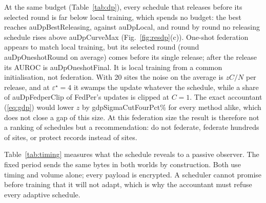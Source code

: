 \begin{table}[t]
\caption{Timing side channel (5 seeds per world): observer AUC (\ref{eq:auc}) for each observable of Section~\ref{sec:setup}; 0.5 is chance}
\label{tab:timing}
\centering\footnotesize
{}
\end{table}
At the same budget (Table~\ref{tab:dp}), every schedule that releases before its selected round is far below local training, which spends no budget: the best reaches \num{auDpBestReleasing}, against \num{auDpLocal}, and round by round no releasing schedule rises above \num{auDpCurveMax} (Fig.~\ref{fig:resdp}(c)). One-shot federation appears to match local training, but  its selected round (round \num{auDpOneshotRound} on average) comes before its single release; after the release its AUROC is \num{auDpOneshotFinal}. It is local training from a common initialisation, not federation. With 20 sites the noise on the average is $zC/N$ per release, and at $\varepsilon^\star=4$ it swamps the update whatever the schedule, while a share of \num{auDpFedperClip} of FedPer's updates is clipped at $C=1$. The exact accountant (\ref{eq:gdp}) would lower $z$ by \num{gdpSigmaCutFourPct}\% for every method alike, which does not close a gap of this size. At this federation size the result is therefore not a ranking of schedules but a recommendation: do not federate, federate hundreds of sites, or protect records instead of sites.

Table~\ref{tab:timing} measures what the schedule reveals to a passive observer. The fixed period sends the same bytes in both worlds by construction.   Both use timing and volume alone; every payload is encrypted. A scheduler cannot promise before training that it will not adapt, which is why the accountant must refuse every adaptive schedule.
